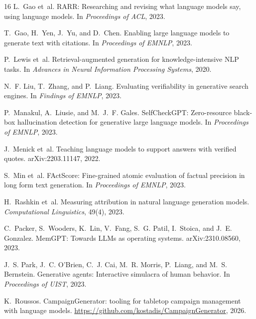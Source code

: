 \documentclass[11pt]{article}
\begin{document}
\begin{thebibliography}{16}
L.~Gao et~al.
\newblock RARR: Researching and revising what language models say, using language
models.
\newblock In \emph{Proceedings of ACL}, 2023.

T.~Gao, H.~Yen, J.~Yu, and D.~Chen.
\newblock Enabling large language models to generate text with citations.
\newblock In \emph{Proceedings of EMNLP}, 2023.

P.~Lewis et~al.
\newblock Retrieval-augmented generation for knowledge-intensive NLP tasks.
\newblock In \emph{Advances in Neural Information Processing Systems}, 2020.

N.~F. Liu, T.~Zhang, and P.~Liang.
\newblock Evaluating verifiability in generative search engines.
\newblock In \emph{Findings of EMNLP}, 2023.

P.~Manakul, A.~Liusie, and M.~J.~F. Gales.
\newblock SelfCheckGPT: Zero-resource black-box hallucination detection for generative
large language models.
\newblock In \emph{Proceedings of EMNLP}, 2023.

J.~Menick et~al.
\newblock Teaching language models to support answers with verified quotes.
\newblock arXiv:2203.11147, 2022.

S.~Min et~al.
\newblock FActScore: Fine-grained atomic evaluation of factual precision in long form
text generation.
\newblock In \emph{Proceedings of EMNLP}, 2023.

H.~Rashkin et~al.
\newblock Measuring attribution in natural language generation models.
\newblock \emph{Computational Linguistics}, 49(4), 2023.

C.~Packer, S.~Wooders, K.~Lin, V.~Fang, S.~G. Patil, I.~Stoica, and J.~E. Gonzalez.
\newblock MemGPT: Towards LLMs as operating systems.
\newblock arXiv:2310.08560, 2023.

J.~S. Park, J.~C. O'Brien, C.~J. Cai, M.~R. Morris, P.~Liang, and M.~S. Bernstein.
\newblock Generative agents: Interactive simulacra of human behavior.
\newblock In \emph{Proceedings of UIST}, 2023.

K.~Roussos.
\newblock CampaignGenerator: tooling for tabletop campaign management with language
models.
\newblock \url{https://github.com/kostadis/CampaignGenerator}, 2026.


\end{thebibliography}
\end{document}
